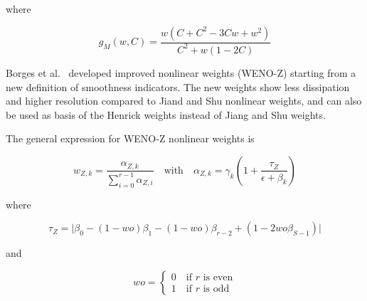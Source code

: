 where

\begin{equation}
  \label{eq:weno_mapping_function}
  g_M (w,C) = \frac{w \left( C + C^2 -3Cw +w^2 \right)}{C^2 + w \left( 1 - 2C \right)}
\end{equation}

Borges et al.~\cite{borges-2008} developed improved nonlinear weights (WENO-Z) starting from a new definition of smoothness indicators. The new weights show less dissipation and higher resolution compared to Jiand and Shu nonlinear weights, and can also be used as basis of the Henrick weights instead of Jiang and Shu weights.

The general expression for WENO-Z nonlinear weights is

\begin{equation}
  \label{eq:weno_Z}
  w_{Z,k} = \frac{\alpha_{Z,k}}{\sum_{i=0}^{r-1} \alpha_{Z,i}} \quad \text{with} \quad \alpha_{Z,k} = \gamma_k \left( 1 + \frac{\tau_Z}{\epsilon + \beta_k} \right)
\end{equation}

where

\begin{equation}
  \label{eq:tau_Z}
  \tau_Z = \lvert \beta_0 - \left( 1 - wo \right) \beta_1 - \left( 1 - wo \right) \beta_{r-2} + \left( 1 - 2wo \beta_{S-1} \right) \rvert
\end{equation}

and

\begin{equation}
  \label{eq:weno_odd}
  wo = \begin{cases}
       0 \quad \text{if $r$ is even} \\
       1 \quad \text{if $r$ is odd}
    \end{cases}
\end{equation}

